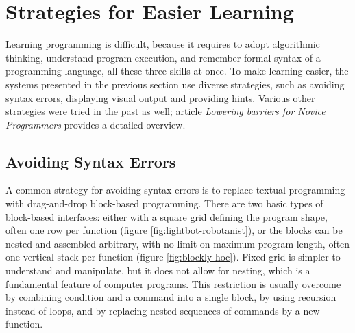 \section{Strategies for Easier Learning}
\label{sec:strategies-for-easier-learning}

Learning programming is difficult,
  because it requires
  to adopt algorithmic thinking,
  understand program execution,
  and remember formal syntax of a programming language,
  all these three skills at once. %
To make learning easier,
  the systems presented in the previous section use diverse strategies,
  such as avoiding syntax errors,
  displaying visual output
  and providing hints.
Various other strategies were tried in the past as well;
article \emph{Lowering barriers for Novice Programmers}
  \cite{lowering-barriers}
  provides a detailed overview.


\subsection{Avoiding Syntax Errors}
\label{sec:avoiding-syntax-errors}

A common strategy for avoiding syntax errors is to replace textual programming
with drag-and-drop block-based programming.
There are two basic types of block-based interfaces:
  either with a square grid defining the program shape,
  often one row per function
  (figure \ref{fig:lightbot-robotanist}),
  or the blocks can be nested and assembled arbitrary,
  with no limit on maximum program length,
  often one vertical stack per function
  (figure \ref{fig:blockly-hoc}).
Fixed grid is simpler to understand and manipulate,
  but it does not allow for nesting,
  which is a fundamental feature of computer programs.
This restriction is usually overcome by
  combining condition and a command into a single block,
  by using recursion instead of loops,
  and by replacing nested sequences of commands by a new function.



